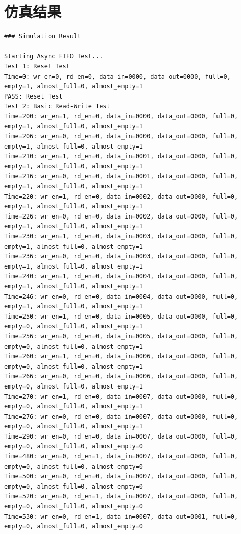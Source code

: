 \documentclass[UTF8]{ctexart}
\begin{document}
\section{仿真结果}
\begin{lstlisting}[frame=shadowbox]
### Simulation Result

Starting Async FIFO Test...
Test 1: Reset Test
Time=0: wr_en=0, rd_en=0, data_in=0000, data_out=0000, full=0, empty=1, almost_full=0, almost_empty=1
PASS: Reset Test
Test 2: Basic Read-Write Test
Time=200: wr_en=1, rd_en=0, data_in=0000, data_out=0000, full=0, empty=1, almost_full=0, almost_empty=1
Time=206: wr_en=0, rd_en=0, data_in=0000, data_out=0000, full=0, empty=1, almost_full=0, almost_empty=1
Time=210: wr_en=1, rd_en=0, data_in=0001, data_out=0000, full=0, empty=1, almost_full=0, almost_empty=1
Time=216: wr_en=0, rd_en=0, data_in=0001, data_out=0000, full=0, empty=1, almost_full=0, almost_empty=1
Time=220: wr_en=1, rd_en=0, data_in=0002, data_out=0000, full=0, empty=1, almost_full=0, almost_empty=1
Time=226: wr_en=0, rd_en=0, data_in=0002, data_out=0000, full=0, empty=1, almost_full=0, almost_empty=1
Time=230: wr_en=1, rd_en=0, data_in=0003, data_out=0000, full=0, empty=1, almost_full=0, almost_empty=1
Time=236: wr_en=0, rd_en=0, data_in=0003, data_out=0000, full=0, empty=1, almost_full=0, almost_empty=1
Time=240: wr_en=1, rd_en=0, data_in=0004, data_out=0000, full=0, empty=1, almost_full=0, almost_empty=1
Time=246: wr_en=0, rd_en=0, data_in=0004, data_out=0000, full=0, empty=1, almost_full=0, almost_empty=1
Time=250: wr_en=1, rd_en=0, data_in=0005, data_out=0000, full=0, empty=0, almost_full=0, almost_empty=1
Time=256: wr_en=0, rd_en=0, data_in=0005, data_out=0000, full=0, empty=0, almost_full=0, almost_empty=1
Time=260: wr_en=1, rd_en=0, data_in=0006, data_out=0000, full=0, empty=0, almost_full=0, almost_empty=1
Time=266: wr_en=0, rd_en=0, data_in=0006, data_out=0000, full=0, empty=0, almost_full=0, almost_empty=1
Time=270: wr_en=1, rd_en=0, data_in=0007, data_out=0000, full=0, empty=0, almost_full=0, almost_empty=1
Time=276: wr_en=0, rd_en=0, data_in=0007, data_out=0000, full=0, empty=0, almost_full=0, almost_empty=1
Time=290: wr_en=0, rd_en=0, data_in=0007, data_out=0000, full=0, empty=0, almost_full=0, almost_empty=0
Time=480: wr_en=0, rd_en=1, data_in=0007, data_out=0000, full=0, empty=0, almost_full=0, almost_empty=0
Time=500: wr_en=0, rd_en=0, data_in=0007, data_out=0000, full=0, empty=0, almost_full=0, almost_empty=0
Time=520: wr_en=0, rd_en=1, data_in=0007, data_out=0000, full=0, empty=0, almost_full=0, almost_empty=0
Time=530: wr_en=0, rd_en=1, data_in=0007, data_out=0001, full=0, empty=0, almost_full=0, almost_empty=0

\end{lstlisting}
\end{document}
